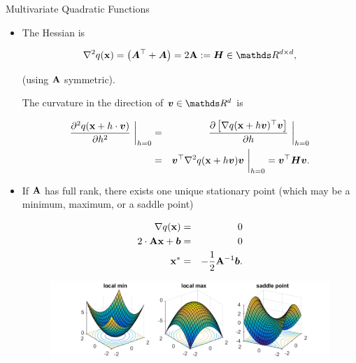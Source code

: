 \documentclass[11pt,compress,t,notes=noshow, xcolor=table]{beamer}
\begin{document}
\begin{vbframe}{Multivariate Quadratic Functions}
\begin{itemize}
  
    \item The Hessian is 
  
    \begin{eqnarray*}
      \nabla^2 q(\xv) = \left(\bm{A}^\top + \bm{A}\right) = 2 \Amat := \bm{H} \in \R^{d \times d},
    \end{eqnarray*}
  
    (using $\mathbf{A}$ symmetric). 
  
    \vspace*{0.2cm}
  
    The curvature in the direction of $\bm{v}\in \R^d$ is 
  
    \begin{eqnarray*}
      \frac{\partial^2 q(\mathbf{x} + h \cdot \bm{v})}{\partial h^2}~\bigg\rvert_{h = 0} &=& \frac{\partial \left[\nabla q(\mathbf{x} + h \bm{v})^\top\bm{v}\right]}{\partial h}~\bigg\rvert_{h = 0} \\ &=& \bm{v}^\top \nabla^2 q(\mathbf{x} + h \bm{v}) \bm{v}~\bigg\rvert_{h = 0} = \bm{v}^\top \bm{H} \bm{v}.
    \end{eqnarray*}
  
  
    \item If $\mathbf{A}$ has full rank, there exists one unique stationary point (which may be a minimum, maximum, or a saddle point) 
  
    \begin{eqnarray*}
      \nabla q(\mathbf{x}) &=& 0 \\
      2 \cdot \mathbf{A} \mathbf{x} + \bm{b} &=& 0 \\
      \mathbf{x}^\ast &=& - \frac{1}{2} \mathbf{A}^{-1} \bm{b}.
    \end{eqnarray*}  
  
  
  \begin{figure}
    \includegraphics{figure_man/minmaxsaddle.png}\\
    \begin{footnotesize} 
    \end{footnotesize}
  \end{figure}
  
  
  \end{itemize}
  

\end{vbframe}
\end{document}
